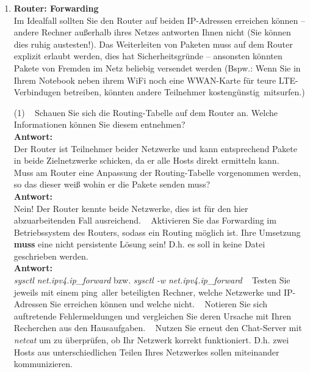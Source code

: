 \documentclass[paper=a4,fontsize=11pt]{scrartcl}%
\numberwithin{equation}{section}
\begin{document}
\begin{enumerate}
		\begin{lstlisting}[style=Bash, language=Bash, label={netcat_client}]
#Client 
nc <ip_of_server> <port_number>
#example
nc 10.0.0.1 4711
		\end{lstlisting}
	\item \textbf{Router: Forwarding}\\
	Im Idealfall sollten Sie den Router auf beiden IP-Adressen erreichen können -- andere Rechner außerhalb ihres Netzes antworten Ihnen nicht (Sie können dies ruhig austesten!). Das Weiterleiten von Paketen muss auf dem Router explizit erlaubt werden, dies hat Sicherheitsgründe -- ansonsten könnten Pakete von Fremden im Netz beliebig versendet werden (Bspw.: Wenn Sie in Ihrem Notebook neben ihrem WiFi noch eine WWAN-Karte für teure LTE-Verbindugen betreiben, könnten andere Teilnehmer \glqq kostengünstig\grqq\ mitsurfen.)
	\begin{tasks}(1)
		\task~ Schauen Sie sich die Routing-Tabelle auf dem Router an. Welche Informationen können Sie diesem entnehmen?\\
		\textbf{Antwort:}\\
		Der Router ist Teilnehmer beider Netzwerke und kann entsprechend Pakete in beide Zielnetzwerke schicken, da er alle Hosts direkt ermitteln kann.
        \task~ Muss am Router eine Anpassung der Routing-Tabelle vorgenommen werden, so das dieser weiß wohin er die Pakete senden muss?\\
        \textbf{Antwort:}\\
        Nein! Der Router kennte beide Netzwerke, dies ist für den hier abzuarbeitenden Fall ausreichend.
        \task~ Aktivieren Sie das Forwarding im Betriebssystem des Routers, sodass ein Routing möglich ist. Ihre Umsetzung \textbf{muss} eine nicht persistente Lösung sein! D.h. es soll in keine Datei geschrieben werden.\\
        \textbf{Antwort:}\\
        \textit{sysctl net.ipv4.ip\_forward} bzw. \textit{sysctl -w net.ipv4.ip\_forward}
		\task~ Testen Sie jeweils mit einem \glqq ping\grqq\ aller beteiligten Rechner, welche Netzwerke und IP-Adressen Sie erreichen können und welche nicht.
		\task~ Notieren Sie sich auftretende Fehlermeldungen und vergleichen Sie deren Ursache mit Ihren Recherchen aus den Hausaufgaben.
		\task~ Nutzen Sie erneut den Chat-Server mit \emph{netcat} um zu überprüfen, ob Ihr Netzwerk korrekt funktioniert. D.h. zwei Hosts aus unterschiedlichen Teilen Ihres Netzwerkes sollen miteinander kommunizieren.
	\end{tasks}

\end{enumerate}
\end{document}
